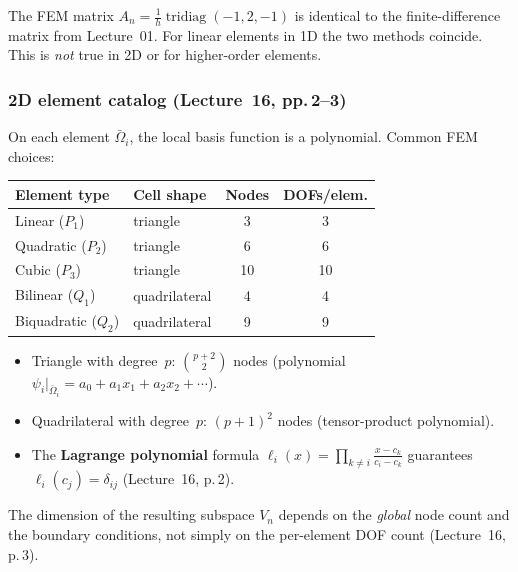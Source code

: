 \documentclass[11pt,a4paper]{article}
\theoremstyle{plain}
\theoremstyle{remark}
\let\origsubsubsection\subsubsection
\renewcommand{\subsubsection}{\needspace{5\baselineskip}\origsubsubsection}
\begin{document}
\begin{warning}
The FEM matrix $A_n = \frac{1}{h}\operatorname{tridiag}(-1,2,-1)$ is
identical to the finite-difference matrix from Lecture~01.
For linear elements in 1D the two methods coincide.
This is \emph{not} true in 2D or for higher-order elements.
\end{warning}

\subsubsection{2D element catalog (Lecture~16, pp.\,2--3)}

On each element $\bar{\Omega}_i$, the local basis function is a polynomial.
Common FEM choices:

\renewcommand{\arraystretch}{1.4}
\begin{center}
\begin{tabular}{@{}llcc@{}}
  \toprule
  \textbf{Element type} & \textbf{Cell shape}
    & \textbf{Nodes} & \textbf{DOFs/elem.}\\
  \midrule
  Linear ($P_1$)      & triangle       & 3  & 3  \\
  Quadratic ($P_2$)   & triangle       & 6  & 6  \\
  Cubic ($P_3$)       & triangle       & 10 & 10 \\
  Bilinear ($Q_1$)    & quadrilateral  & 4  & 4  \\
  Biquadratic ($Q_2$) & quadrilateral  & 9  & 9  \\
  \bottomrule
\end{tabular}
\end{center}

\begin{itemize}[nosep]
  \item Triangle with degree~$p$:
        $\binom{p+2}{2}$ nodes
        (polynomial $\psi_i|_{\bar\Omega_i}
        = a_0 + a_1 x_1 + a_2 x_2 + \cdots$).
  \item Quadrilateral with degree~$p$:
        $(p+1)^2$ nodes (tensor-product polynomial).
  \item The \textbf{Lagrange polynomial} formula
        $\ell_i(x) = \prod_{k \neq i}
        \frac{x - c_k}{c_i - c_k}$
        guarantees $\ell_i(c_j) = \delta_{ij}$
        (Lecture~16, p.\,2).
\end{itemize}

\begin{warning}
The dimension of the resulting subspace $V_n$ depends on the
\emph{global} node count and the boundary conditions, not simply on
the per-element DOF count (Lecture~16, p.\,3).
\end{warning}
\end{document}
